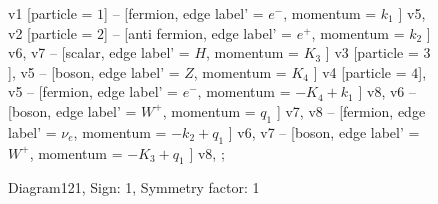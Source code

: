 \documentclass{revtex4}
\begin{document}
\begin{figure}[!htb]
\begin{center}
{    %
v1 [particle = \(1\)] -- [fermion, edge label' = \(e^{-}\), momentum = \(k_{1}\) ] v5, 
v2 [particle = \(2\)] -- [anti fermion, edge label' = \(e^{+}\), momentum = \(k_{2}\) ] v6, 
v7 -- [scalar, edge label' = \(H\), momentum = \(K_{3}\) ] v3 [particle = \(3\)], 
v5 -- [boson, edge label' = \(Z\), momentum = \(K_{4}\) ] v4 [particle = \(4\)], 
v5 -- [fermion, edge label' = \(e^{-}\), momentum = \(-K_{4} + k_{1}\) ] v8, 
v6 -- [boson, edge label' = \(W^{+}\), momentum = \(q_{1}\) ] v7, 
v8 -- [fermion, edge label' = \(\nu_{e}\), momentum = \(-k_{2} + q_{1}\) ] v6, 
v7 -- [boson, edge label' = \(W^{+}\), momentum = \(-K_{3} + q_{1}\) ] v8, 
};
\end{center}
\caption{Diagram121, Sign: 1, Symmetry factor: 1}
\end{figure}
\newpage
\end{document}
